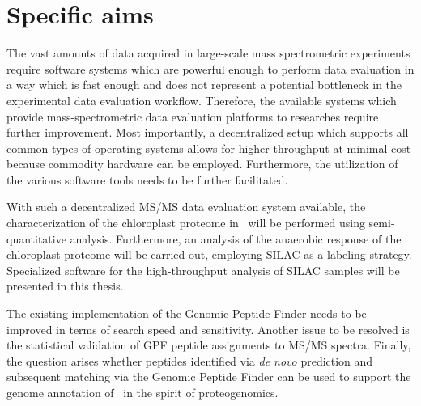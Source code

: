 \chapter{Specific aims}

The vast amounts of data acquired in large-scale mass spectrometric experiments
require software systems which are powerful enough to perform data evaluation
in a way which is fast enough and does not represent a potential bottleneck in 
the experimental data evaluation workflow.
Therefore, the available systems which provide mass-spectrometric data 
evaluation platforms to researches require further improvement.
Most importantly, a decentralized setup which supports all common types of 
operating systems allows for higher throughput at minimal cost because commodity
hardware can be employed.
Furthermore, the utilization of the various software tools needs to be further 
facilitated.

With such a decentralized MS/MS data evaluation system available, the
characterization of the chloroplast proteome in \cre~will be performed using
semi-quantitative analysis.
Furthermore, an analysis of the anaerobic response of the chloroplast proteome
will be carried out, employing SILAC as a labeling strategy.
Specialized software for the high-throughput analysis of SILAC samples will
be presented in this thesis.

The existing implementation of the Genomic Peptide Finder needs to
be improved in terms of search speed and sensitivity.
Another issue to be resolved is the statistical validation of GPF peptide 
assignments to MS/MS spectra.
Finally, the question arises whether peptides identified via {\em de novo} prediction
and subsequent matching via the Genomic Peptide Finder can be used to support 
the genome annotation of \cre~in the spirit of proteogenomics.
